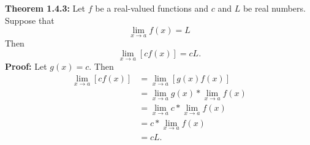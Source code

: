 \documentclass{article}
\begin{document}
\textbf{Theorem 1.4.3:} Let $f$ be a real-valued functions and $c$ and $L$ be real numbers. Suppose that
$$\lim_{x \to a}{f(x)} = L$$
Then
$$\lim_{x \to a}[{cf(x)}] = cL.$$
\textbf{Proof:} Let $g(x) = c$. Then
\begin{align*}
\lim_{x \to a}[{cf(x)}] &= \lim_{x \to a}[{g(x)f(x)}] \\
                        &= \lim_{x \to a}{g(x)} * \lim_{x \to a}{f(x)} \tag{Theorem 1.4.2} \\
                        &= \lim_{x \to a}{c} * \lim_{x \to a}{f(x)} \\
                        &= c * \lim_{x \to a}{f(x)} \tag{Theorem 1.3.3} \\
                        &= cL.
\end{align*}
\end{document}
